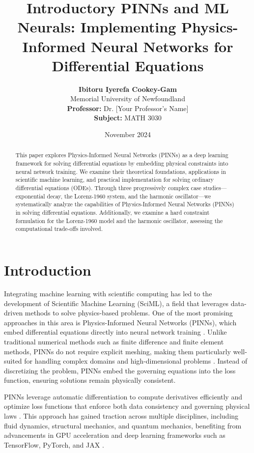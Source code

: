 \documentclass{article}
\title{Introductory PINNs and ML Neurals: Implementing Physics-Informed Neural Networks for Differential Equations}
\author{
    \textbf{Ibitoru Iyerefa Cookey-Gam} \\  %
    Memorial University of Newfoundland \\  %
    \textbf{Professor:} Dr. [Your Professor's Name] \\  %
    \textbf{Subject:} MATH 3030 \\  %
}
\date{November 2024}
\begin{document}
\maketitle


\begin{abstract}
This paper explores Physics-Informed Neural Networks (PINNs) as a deep learning framework for solving differential equations by embedding physical constraints into neural network training. We examine their theoretical foundations, applications in scientific machine learning, and practical implementation for solving ordinary differential equations (ODEs).
Through three progressively complex case studies—exponential decay, the Lorenz-1960 system, and the harmonic oscillator—we systematically analyze the capabilities of Physics-Informed Neural Networks (PINNs) in solving differential equations. Additionally, we examine a hard constraint formulation for the Lorenz-1960 model and the harmonic oscillator, assessing the computational trade-offs involved.

\end{abstract}


\newpage

\tableofcontents

\newpage

\section{Introduction}
Integrating machine learning with scientific computing has led to the development of Scientific Machine Learning (SciML), a field that leverages data-driven methods to solve physics-based problems. One of the most promising approaches in this area is Physics-Informed Neural Networks (PINNs), which embed differential equations directly into neural network training \cite{raissi2019physics}. Unlike traditional numerical methods such as finite difference and finite element methods, PINNs do not require explicit meshing, making them particularly well-suited for handling complex domains and high-dimensional problems \cite{lagaris1998artificial}. Instead of discretizing the problem, PINNs embed the governing equations into the loss function, ensuring solutions remain physically consistent.

PINNs leverage automatic differentiation to compute derivatives efficiently and optimize loss functions that enforce both data consistency and governing physical laws \cite{Physics_Informed_Deep_Learning_Part1_Raissi_Peridkaris_Karniadakis}. This approach has gained traction across multiple disciplines, including fluid dynamics, structural mechanics, and quantum mechanics, benefiting from advancements in GPU acceleration and deep learning frameworks such as TensorFlow, PyTorch, and JAX \cite{Attention_Is_All_You_Need_Transformer_Vaswani_2017}.
\end{document}
